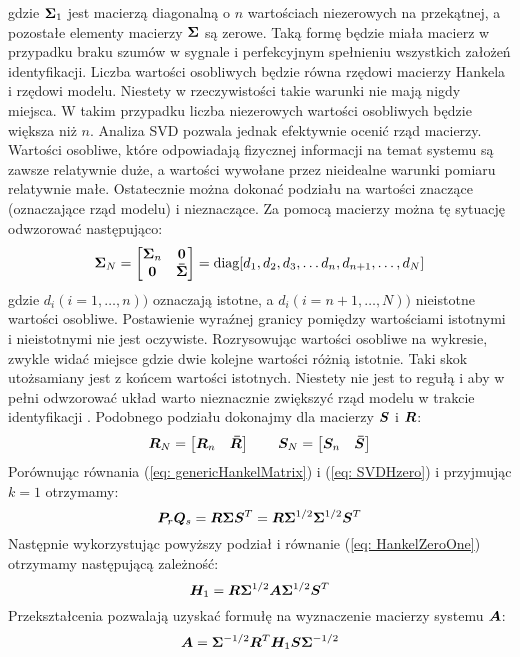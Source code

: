 gdzie $\bm{\Sigma}_1$ jest macierzą diagonalną o $n$ wartościach niezerowych na przekątnej, a pozostałe elementy macierzy $\bm{\Sigma}$ są zerowe. Taką formę będzie miała macierz w przypadku braku szumów w sygnale i perfekcyjnym spełnieniu wszystkich założeń identyfikacji. Liczba wartości osobliwych będzie równa rzędowi macierzy Hankela i rzędowi modelu. Niestety w rzeczywistości takie warunki nie mają nigdy miejsca. W takim przypadku liczba niezerowych wartości osobliwych będzie większa niż $n$. Analiza SVD pozwala jednak efektywnie ocenić rząd macierzy. Wartości osobliwe, które odpowiadają fizycznej informacji na temat systemu są zawsze relatywnie duże, a wartości wywołane przez nieidealne warunki pomiaru relatywnie małe. Ostatecznie można dokonać podziału na wartości znaczące (oznaczające rząd modelu) i nieznaczące. Za pomocą macierzy można tę sytuację odwzorować następująco:
\begin{equation}
	\bm{\Sigma}_N = \begin{bmatrix}
		\bm{\Sigma}_n & \bm{0} \\
		\bm{0} & \bm{\bar{\Sigma}}
	\end{bmatrix} = \text{diag}[d_1,d_2,d_3,\dots d_n,d_{n+1},\dots,d_N]
\end{equation}
gdzie $d_i(i=1,\dots,n)) $ oznaczają istotne, a $d_i(i=n+1,\dots,N))$ nieistotne wartości osobliwe. Postawienie wyraźnej granicy pomiędzy wartościami istotnymi i nieistotnymi nie jest oczywiste. Rozrysowując wartości osobliwe na wykresie, zwykle widać miejsce gdzie dwie kolejne wartości różnią istotnie. Taki skok utożsamiany jest z końcem wartości istotnych. Niestety nie jest to regułą i aby w pełni odwzorować układ warto nieznacznie zwiększyć rząd modelu w trakcie identyfikacji \parencite{Szafranski2013,Hollkamp2001}. Podobnego podziału dokonajmy dla macierzy $\bm{S}$ i $\bm{R}$:
\begin{equation}
	\bm{R}_N = \begin{bmatrix}
		\bm{R}_n & \bm{\bar{R}} 
	\end{bmatrix} 
	\qquad 
	\bm{S}_N = \begin{bmatrix}
		\bm{S}_n & \bm{\bar{S}} 
	\end{bmatrix}
\end{equation}
Porównując równania (\ref{eq: genericHankelMatrix}) i (\ref{eq: SVDHzero}) i przyjmując $k=1$ otrzymamy:
\begin{equation} 
	\bm{P}_r\bm{Q}_s=\bm{R}\bm{\Sigma} \bm{S}^T = \bm{R}\bm{\Sigma}^{1/2}\bm{\Sigma}^{1/2} \bm{S}^T
\end{equation}
Następnie wykorzystując powyższy podział i równanie (\ref{eq: HankelZeroOne}) otrzymamy następującą zależność:
\begin{equation} 
	\bm{H}_1 =\bm{R}\bm{\Sigma}^{1/2}\bm{A}\bm{\Sigma}^{1/2} \bm{S}^T
\end{equation}
Przekształcenia pozwalają uzyskać formułę na wyznaczenie macierzy systemu $\bm{A}$:
\begin{equation} 
	\bm{A} =\bm{\Sigma}^{-1/2}\bm{R}^T\bm{H}_1\bm{S}\bm{\Sigma}^{-1/2}
\end{equation}

